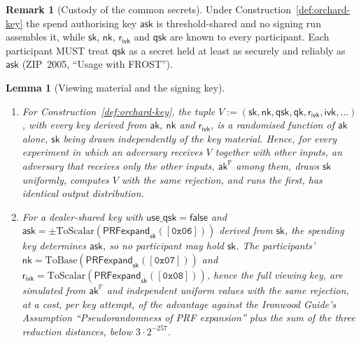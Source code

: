 \documentclass[11pt,a4paper]{article}
\newtheorem{lemma}[theorem]{Lemma}
\theoremstyle{definition}
\newtheorem{remark}[theorem]{Remark}
\newcommand{\PP}{\mathbb{P}}
\newcommand{\ask}{\ensuremath{\mathsf{ask}}}
\newcommand{\aksym}{\ensuremath{\mathsf{ak}}}
\newcommand{\nksym}{\ensuremath{\mathsf{nk}}}
\newcommand{\ivk}{\ensuremath{\mathsf{ivk}}}
\newcommand{\rivk}{\ensuremath{\mathsf{r_{ivk}}}}
\begin{document}
\begin{remark}[Custody of the common secrets]\label{rem:common-secrets}
Under Construction~\ref{def:orchard-key} the spend authorising key \(\ask\)
is threshold-shared and no signing run assembles it, while
\(\mathsf{sk}\), \(\nksym\), \(\rivk\) and \(\mathsf{qsk}\) are known to
every participant. Each participant MUST treat \(\mathsf{qsk}\) as a secret
held at least as securely and reliably as \(\ask\) (ZIP~2005, ``Usage with
FROST'').
\end{remark}

\begin{lemma}[Viewing material and the signing key]\label{lem:viewing}
\begin{enumerate}
\item[(a)] For Construction~\ref{def:orchard-key}, the tuple
  \(V := (\mathsf{sk}, \nksym, \mathsf{qsk}, \mathsf{qk}, \rivk, \ivk,
  \ldots)\), with every key derived from \(\aksym\), \(\nksym\) and
  \(\rivk\), is a randomised function of \(\aksym\) alone, \(\mathsf{sk}\)
  being drawn independently of the key material. Hence, for every experiment
  in which an adversary receives \(V\) together with other inputs, an
  adversary that receives only the other inputs, \(\aksym^{\PP}\) among
  them, draws \(\mathsf{sk}\) uniformly, computes \(V\) with the same
  rejection, and runs the first, has identical output distribution.
\item[(b)] For a dealer-shared key with
  \(\mathsf{use\_qsk} = \mathsf{false}\) and
  \(\ask = \pm \mathrm{ToScalar}(\mathsf{PRFexpand}_{\mathsf{sk}}
  ([\mathtt{0x06}]))\) derived from \(\mathsf{sk}\), the spending key
  determines \(\ask\), so no participant may hold \(\mathsf{sk}\). The
  participants' \(\nksym =
  \mathrm{ToBase}(\mathsf{PRFexpand}_{\mathsf{sk}}([\mathtt{0x07}]))\) and
  \(\rivk = \mathrm{ToScalar}(\mathsf{PRFexpand}_{\mathsf{sk}}
  ([\mathtt{0x08}]))\), hence the full viewing key, are simulated from
  \(\aksym^{\PP}\) and independent uniform values with the same rejection,
  at a cost, per key attempt, of the advantage against the \emph{Ironwood
  Guide}'s Assumption ``Pseudorandomness of PRF expansion'' plus the sum of
  the three reduction distances, below \(3 \cdot 2^{-257}\).
\end{enumerate}
\end{lemma}
\end{document}
